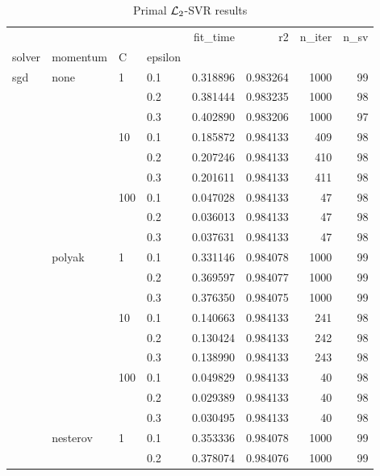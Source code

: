 \begin{table}[H]
\centering
\caption{Primal $\protect \mathcal{L}_2$-SVR results}
\label{primal_l2_svr_cv_results}
\begin{tabular}{llllrrrr}
\toprule
          &   &     &     &  fit\_time &        r2 &  n\_iter &  n\_sv \\
solver & momentum & C & epsilon &           &           &         &       \\
\midrule
sgd & none & 1   & 0.1 &  0.318896 &  0.983264 &    1000 &    99 \\
          &   &     & 0.2 &  0.381444 &  0.983235 &    1000 &    98 \\
          &   &     & 0.3 &  0.402890 &  0.983206 &    1000 &    97 \\
          &   & 10  & 0.1 &  0.185872 &  0.984133 &     409 &    98 \\
          &   &     & 0.2 &  0.207246 &  0.984133 &     410 &    98 \\
          &   &     & 0.3 &  0.201611 &  0.984133 &     411 &    98 \\
          &   & 100 & 0.1 &  0.047028 &  0.984133 &      47 &    98 \\
          &   &     & 0.2 &  0.036013 &  0.984133 &      47 &    98 \\
          &   &     & 0.3 &  0.037631 &  0.984133 &      47 &    98 \\
          & polyak & 1   & 0.1 &  0.331146 &  0.984078 &    1000 &    99 \\
          &   &     & 0.2 &  0.369597 &  0.984077 &    1000 &    99 \\
          &   &     & 0.3 &  0.376350 &  0.984075 &    1000 &    99 \\
          &   & 10  & 0.1 &  0.140663 &  0.984133 &     241 &    98 \\
          &   &     & 0.2 &  0.130424 &  0.984133 &     242 &    98 \\
          &   &     & 0.3 &  0.138990 &  0.984133 &     243 &    98 \\
          &   & 100 & 0.1 &  0.049829 &  0.984133 &      40 &    98 \\
          &   &     & 0.2 &  0.029389 &  0.984133 &      40 &    98 \\
          &   &     & 0.3 &  0.030495 &  0.984133 &      40 &    98 \\
          & nesterov & 1   & 0.1 &  0.353336 &  0.984078 &    1000 &    99 \\
          &   &     & 0.2 &  0.378074 &  0.984076 &    1000 &    99 \\

\end{tabular}
\end{table}
